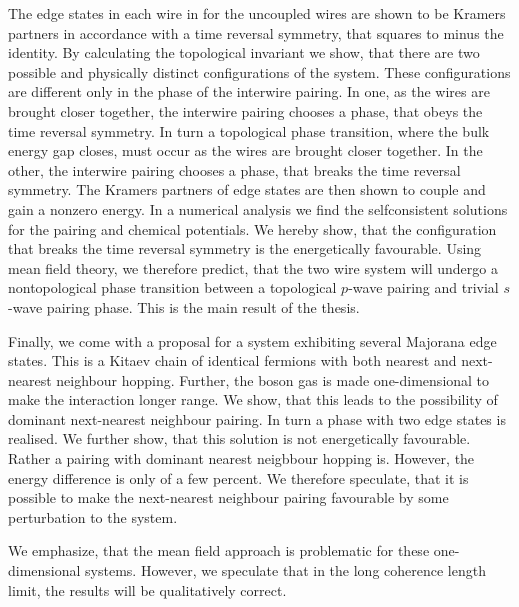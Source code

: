 \documentclass[11pt, twoside]{Thesis}
\begin{document}
The edge states in each wire in for the uncoupled wires are shown to be Kramers partners in accordance with a time reversal symmetry, that squares to minus the identity. By calculating the topological invariant we show, that there are two possible and physically distinct configurations of the system. These configurations are different only in the phase of the interwire pairing. In one, as the wires are brought closer together, the interwire pairing chooses a phase, that obeys the time reversal symmetry. In turn a topological phase transition, where the bulk energy gap closes, must occur as the wires are brought closer together. In the other, the interwire pairing chooses a phase, that breaks the time reversal symmetry. The Kramers partners of edge states are then shown to couple and gain a nonzero energy. In a numerical analysis we find the selfconsistent solutions for the pairing and chemical potentials. We hereby show, that the configuration that breaks the time reversal symmetry is the energetically favourable. Using mean field theory, we therefore predict, that the two wire system will undergo a nontopological phase transition between a topological $p$-wave pairing and trivial $s$-wave pairing phase. This is the main result of the thesis. 

Finally, we come with a proposal for a system exhibiting several Majorana edge states. This is a Kitaev chain of identical fermions with both nearest and next-nearest neighbour hopping. Further, the boson gas is made one-dimensional to make the interaction longer range. We show, that this leads to the possibility of dominant next-nearest neighbour pairing. In turn a phase with two edge states is realised. We further show, that this solution is not energetically favourable. Rather a pairing with dominant nearest neigbbour hopping is. However, the energy difference is only of a few percent. We therefore speculate, that it is possible to make the next-nearest neighbour pairing favourable by some perturbation to the system. 

We emphasize, that the mean field approach is problematic for these one-dimensional systems. However, we speculate that in the long coherence length limit, the results will be qualitatively correct. 
\newpage 

\end{document}
